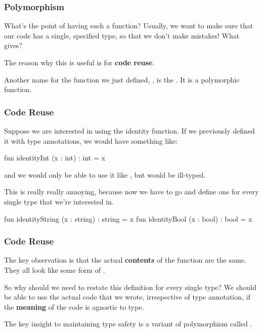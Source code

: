 \documentclass[aspectratio=169]{beamer}
\begin{document}
\begin{frame}[fragile]
  \frametitle{Polymorphism}

  What's the point of having such a function? Usually, we want to make sure that
  our code has a single, specified type, so that we don't make mistakes! What gives?

  The reason why this is useful is for \textbf{code reuse}.
  

  Another name for the function we just defined, , is the 
  . It is a polymorphic function.
\end{frame}

\begin{frame}[fragile]
  \frametitle{Code Reuse}

  Suppose we are interested in using the identity function. If we previously
  defined it with type annotations, we would have something like:

  \begin{codeblock}
    fun identityInt (x : int) : int = x
  \end{codeblock}

  and we would only be able to use it like , but 
   would be ill-typed.

  This is really really annoying, because now we have to go and define one for
  every single type that we're interested in.

  \begin{codeblock}
    fun identityString (x : string) : string = x
    fun identityBool   (x : bool)   : bool   = x
  \end{codeblock}
\end{frame}

\begin{frame}[fragile]
  \frametitle{Code Reuse}

  The key observation is that the actual \textbf{contents} of the function 
  are the same. They all look like some form of .

  So why should we need to restate this definition for every single type? We
  should be able to use the actual code that we wrote, irrespective of 
  type annotation, if the \textbf{meaning} of the code is agnostic to type.  

  The key insight to maintaining type safety is a variant of polymorphism called
  .
\end{frame}
\end{document}
